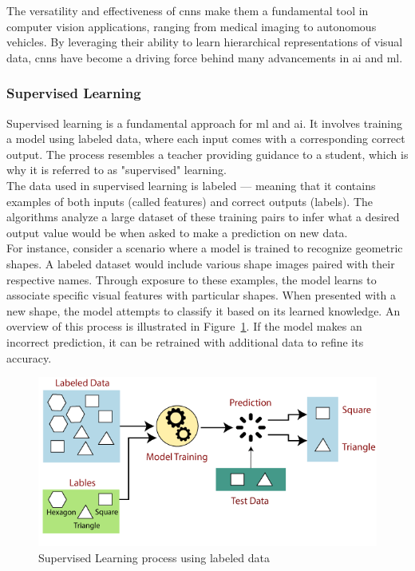 The versatility and effectiveness of \glspl{cnn} make them a fundamental tool in computer vision applications, ranging from medical imaging to autonomous vehicles. By leveraging their ability to learn hierarchical representations of visual data, \glspl{cnn} have become a driving force behind many advancements in \gls{ai} and \gls{ml}.

\subsubsection*{Supervised Learning}
\label{subsubsec:supervised-learning}

Supervised learning is a fundamental approach for \gls{ml} and \gls{ai}. It involves training a model using labeled data, where each input comes with a corresponding correct output. The process resembles a teacher providing guidance to a student, which is why it is referred to as "supervised" learning. \cite{geeksforgeeks:supervised-learning} \\

The data used in supervised learning is labeled — meaning that it contains examples of both inputs (called features) and correct outputs (labels). The algorithms analyze a large dataset of these training pairs to infer what a desired output value would be when asked to make a prediction on new data. \cite{google:supervised-learning} \\

For instance, consider a scenario where a model is trained to recognize geometric shapes. A labeled dataset would include various shape images paired with their respective names. Through exposure to these examples, the model learns to associate specific visual features with particular shapes. When presented with a new shape, the model attempts to classify it based on its learned knowledge. An overview of this process is illustrated in Figure~\ref{fig:supervised-learning}. If the model makes an incorrect prediction, it can be retrained with additional data to refine its accuracy. \cite{google:supervised-learning} \\

\begin{figure}[h!]
    \centering
    \includegraphics[width=0.75\linewidth]{figures/theory/supervised-learning.png}
    \caption[Supervised Learning process using labeled data]{Supervised Learning process using labeled data \cite{tpointtech:supervised-learning}}
    \label{fig:supervised-learning}
\end{figure}

